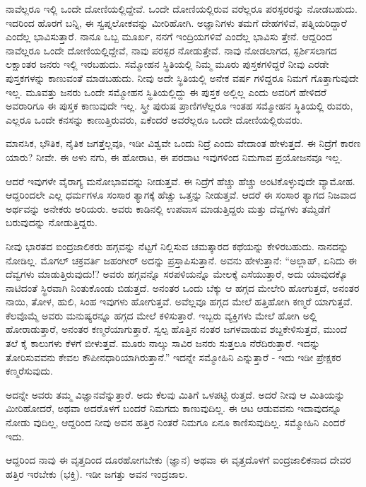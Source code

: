 ನಾವೆಲ್ಲರೂ ಇಲ್ಲಿ ಒಂದೇ ದೋಣಿಯಲ್ಲಿದ್ದೇವೆ. ಒಂದೇ ದೋಣಿಯಲ್ಲಿರುವ ವರೆಲ್ಲರೂ ಪರಸ್ಪರರನ್ನು ನೋಡಬಹುದು. ಇದರಿಂದ ಹೊರಗೆ ಬನ್ನಿ, ಈ ಸ್ವಪ್ನಲೋಕವನ್ನು ಮೀರಿಹೋಗಿ. ಅಜ್ಞಾನಿಗಳು ತಮಗೆ ದೇಹಗಳಿವೆ, ಪತ್ನಿಯರಿದ್ದಾರೆ ಎಂದೆಲ್ಲ ಭಾವಿಸುತ್ತಾರೆ. ನಾನೂ ಒಬ್ಬ ಮೂರ್ಖ, ನನಗೆ ಇಂದ್ರಿಯಗಳಿವೆ ಎಂದೆಲ್ಲ ಭಾವಿಸು ತ್ತೇನೆ. ಆದ್ದರಿಂದ ನಾವೆಲ್ಲರೂ ಒಂದೇ ದೋಣಿಯಲ್ಲಿದ್ದೇವೆ, ನಾವು ಪರಸ್ಪರ ನೋಡುತ್ತೇವೆ. ನಾವು ನೋಡಲಾಗದ, ಸ್ಪರ್ಶಿಸಲಾಗದ ಲಕ್ಷಾಂತರ ಜನರು ಇಲ್ಲಿ ಇರಬಹುದು. ಸಮ್ಮೋಹನ ಸ್ಥಿತಿಯಲ್ಲಿ ನಿಮ್ಮ ಮೂರು ಪುಸ್ತಕಗಳಿದ್ದರೆ ನೀವು ಎರಡೇ ಪುಸ್ತಕಗಳನ್ನು ಕಾಣುವಂತೆ ಮಾಡಬಹುದು. ನೀವು ಅದೇ ಸ್ಥಿತಿಯಲ್ಲಿ ಅನೇಕ ವರ್ಷ ಗಳಿದ್ದರೂ ನಿಮಗೆ ಗೊತ್ತಾಗುವುದೇ ಇಲ್ಲ. ಮೂವತ್ತು ಜನರು ಒಂದೇ ಸಮ್ಮೋಹನ ಸ್ಥಿತಿಯಲ್ಲಿದ್ದು ಈ ಪುಸ್ತಕ ಅಲ್ಲಿಲ್ಲ ಎಂದು ಅವರಿಗೆ ಹೇಳಿದರೆ ಅವರಾರಿಗೂ ಈ ಪುಸ್ತಕ ಕಾಣುವುದೇ ಇಲ್ಲ. ಸ್ತ್ರೀ ಪುರುಷ ಪ್ರಾಣಿಗಳೆಲ್ಲರೂ ಇಂತಹ ಸಮ್ಮೋಹನ ಸ್ಥಿತಿಯಲ್ಲಿ ರುವರು, ಎಲ್ಲರೂ ಒಂದೇ ಕನಸನ್ನು ಕಾಣುತ್ತಿರುವರು, ಏಕೆಂದರೆ ಅವರೆಲ್ಲರೂ ಒಂದೇ ದೋಣಿಯಲ್ಲಿರುವರು.

ಮಾನಸಿಕ, ಭೌತಿಕ, ನೈತಿಕ ಜಗತ್ತೆಲ್ಲವೂ, ಇಡೀ ವಿಶ್ವವೇ ಒಂದು ನಿದ್ರೆ ಎಂದು ವೇದಾಂತ ಹೇಳುತ್ತದೆ. ಈ ನಿದ್ರೆಗೆ ಕಾರಣ ಯಾರು? ನೀವೇ. ಈ ಅಳು ನಗು, ಈ ಹೋರಾಟ, ಈ ಪರದಾಟ ಇವುಗಳಿಂದ ನಿಮಗಾವ ಪ್ರಯೋಜನವೂ ಇಲ್ಲ.

ಆದರೆ ಇವುಗಳೇ ವೈರಾಗ್ಯ ಮನೋಭಾವವನ್ನು ನೀಡುತ್ತವೆ. ಈ ನಿದ್ರೆಗೆ ಹೆಚ್ಚು ಹೆಚ್ಚು ಅಂಟಿಕೊಳ್ಳುವುದೇ ವ್ಯಾಮೋಹ. ಆದ್ದರಿಂದಲೇ ಎಲ್ಲ ಧರ್ಮಗಳೂ ಸಂಸಾರ ತ್ಯಾಗಕ್ಕೆ ಹೆಚ್ಚು ಒತ್ತನ್ನು ನೀಡುತ್ತವೆ. ಆದರೆ ಈ ಸಂಸಾರ ತ್ಯಾಗದ ನಿಜವಾದ ಅರ್ಥವನ್ನು ಅನೇಕರು ಅರಿಯರು. ಅವರು ಕಾಡಿನಲ್ಲಿ ಉಪವಾಸ ಮಾಡುತ್ತಿದ್ದರು ಮತ್ತು ದೆವ್ವಗಳು ತಮ್ಮೆಡೆಗೆ ಬರುವುದನ್ನು ನೋಡುತ್ತಿದ್ದರು.

ನೀವು ಭಾರತದ ಐಂದ್ರಜಾಲಿಕರು ಹಗ್ಗವನ್ನು ನೆಟ್ಟಗೆ ನಿಲ್ಲಿಸುವ ಚಮತ್ಕಾರದ ಕಥೆಯನ್ನು ಕೇಳಿರಬಹುದು. ನಾನದನ್ನು ನೋಡಿಲ್ಲ. ಮೊಗಲ್ ಚಕ್ರವರ್ತಿ ಜಹಂಗೀರ್ ಅದನ್ನು ಪ್ರಸ್ತಾಪಿಸುತ್ತಾನೆ. ಅವನು ಹೇಳುತ್ತಾನೆ: “ಅಲ್ಲಾಹ್, ಏನಿದು ಈ ದೆವ್ವಗಳು ಮಾಡುತ್ತಿರುವುದು!? ಅವರು ಹಗ್ಗವನ್ನೊ ಸರಪಳಿಯನ್ನೊ ಮೇಲಕ್ಕೆ ಎಸೆಯುತ್ತಾರೆ, ಅದು ಯಾವುದಕ್ಕೊ ನಾಟಿದಂತೆ ಸ್ಥಿರವಾಗಿ ನಿಂತುಕೊಂಡು ಬಿಡುತ್ತದೆ. ಅನಂತರ ಒಂದು ಬೆಕ್ಕು ಆ ಹಗ್ಗದ ಮೇಲೇರಿ ಹೋಗುತ್ತದೆ, ಅನಂತರ ನಾಯಿ, ತೋಳ, ಹುಲಿ, ಸಿಂಹ ಇವುಗಳು ಹೋಗುತ್ತವೆ. ಅವೆಲ್ಲವೂ ಹಗ್ಗದ ಮೇಲೆ ಹತ್ತಿಹೋಗಿ ಕಣ್ಮರೆ ಯಾಗುತ್ತವೆ. ಕೆಲವೊಮ್ಮೆ ಅವರು ಮನುಷ್ಯರನ್ನೂ ಹಗ್ಗದ ಮೇಲೆ ಕಳಿಸುತ್ತಾರೆ. ಇಬ್ಬರು ವ್ಯಕ್ತಿಗಳು ಮೇಲೆ ಹೋಗಿ ಅಲ್ಲಿ ಹೋರಾಡುತ್ತಾರೆ, ಅನಂತರ ಕಣ್ಮರೆಯಾಗುತ್ತಾರೆ. ಸ್ವಲ್ಪ ಹೊತ್ತಿನ ನಂತರ ಜಗಳವಾಡುವ ಶಬ್ದಕೇಳಿಸುತ್ತದೆ, ಮುಂದೆ ತಲೆ ಕೈ ಕಾಲುಗಳು ಕೆಳಗೆ ಬೀಳುತ್ತವೆ. ಮೂರು ನಾಲ್ಕು ಸಾವಿರ ಜನರು ಸುತ್ತಲೂ ನೆರೆದಿರುತ್ತಾರೆ. ಇದನ್ನು ತೋರಿಸುವವನು ಕೇವಲ ಕೌಪೀನಧಾರಿಯಾಗಿರುತ್ತಾನೆ.” ಇದನ್ನೇ ಸಮ್ಮೋಹಿನಿ ಎನ್ನುತ್ತಾರೆ - ಇದು ಇಡೀ ಪ್ರೇಕ್ಷಕರ ಕಣ್ಮರೆಸುವುದು.

ಅದನ್ನೇ ಅವರು ತಮ್ಮ ವಿಜ್ಞಾನವೆನ್ನುತ್ತಾರೆ. ಅದು ಕೆಲವು ಮಿತಿಗೆ ಒಳಪಟ್ಟಿ ರುತ್ತದೆ. ಅದರೆ ನೀವು ಆ ಮಿತಿಯನ್ನು ಮೀರಿಹೋದರೆ, ಅಥವಾ ಅದರೊಳಗೆ ಬಂದರೆ ನಿಮಗದು ಕಾಣುವುದಿಲ್ಲ. ಈ ಆಟ ಆಡುವವನು ಇದಾವುದನ್ನೂ ನೋಡು ವುದಿಲ್ಲ, ಆದ್ದರಿಂದ ನೀವು ಅವನ ಹತ್ತಿರ ನಿಂತರೆ ನಿಮಗೂ ಏನೂ ಕಾಣಿಸುವುದಿಲ್ಲ. ಸಮ್ಮೋಹಿನಿ ಎಂದರೆ ಇದು.

ಆದ್ದರಿಂದ ನಾವು ಈ ವೃತ್ತದಿಂದ ದೂರಹೋಗಬೇಕು (ಜ್ಞಾನ) ಅಥವಾ ಈ ವೃತ್ತದೊಳಗೆ ಐಂದ್ರಜಾಲಿಕನಾದ ದೇವರ ಹತ್ತಿರ ಇರಬೇಕು (ಭಕ್ತಿ). ಇಡೀ ಜಗತ್ತು ಅವನ ಇಂದ್ರಜಾಲ.

